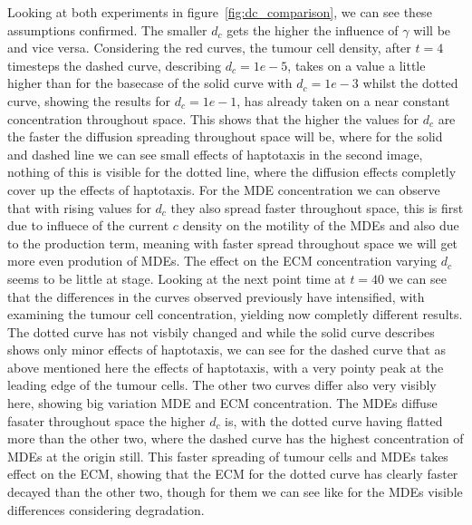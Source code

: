 Looking at both experiments in figure~\ref{fig:dc_comparison}, we can see these assumptions confirmed. The smaller $d_c$ gets the higher the influence of $\gamma$ will be and vice versa. Considering the red curves, the tumour cell density, after $t=4$ timesteps the dashed curve, describing $d_c=1e-5$, takes on a value a little higher than for the basecase of the solid curve with $d_c=1e-3$ whilst the dotted curve, showing the results for $d_c=1e-1$, has already taken on a near constant concentration throughout space. This shows that the higher the values for $d_c$ are the faster the diffusion spreading throughout space will be, where for the solid and dashed line we can see small effects of haptotaxis in the second image, nothing of this is visible for the dotted line, where the diffusion effects completly cover up the effects of haptotaxis. For the MDE concentration we can observe that with rising values for $d_c$ they also spread faster throughout space, this is first due to influece of the current $c$ density on the motility of the MDEs and also due to the production term, meaning with faster spread throughout space we will get more even prodution of MDEs. The effect on the ECM concentration varying $d_c$ seems to be little at stage. 
Looking at the next point time at $t=40$ we can see that the differences in the curves observed previously have intensified, with examining the tumour cell concentration, yielding now completly different results. The dotted curve has not visbily changed and while the solid curve describes shows only minor effects of haptotaxis, we can see for the dashed curve that as above mentioned here the effects of haptotaxis, with a very pointy peak at the leading edge of the tumour cells. The other two curves differ also very visibly here, showing big variation MDE and ECM concentration. The MDEs diffuse fasater throughout space the higher $d_c$ is, with the dotted curve having flatted more than the other two, where the dashed curve has the highest concentration of MDEs at the origin still. This faster spreading of tumour cells and MDEs takes effect on the ECM, showing that the ECM for the dotted curve has clearly faster decayed than the other two, though for them we can see like for the MDEs visible differences considering degradation. 
